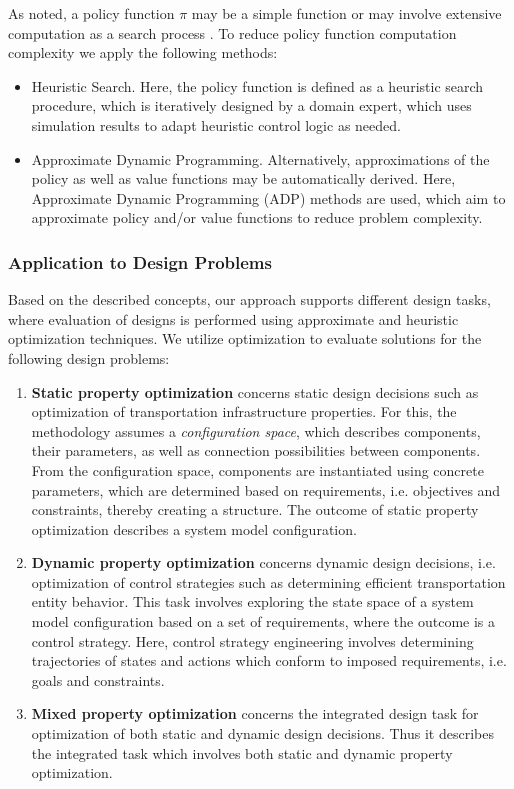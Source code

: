 \documentclass[a4paper,twoside]{article}
\begin{document}
As noted, a policy function $\pi$ may be a simple function or may involve extensive computation as a search process \cite{mania2018simple}. To reduce policy function computation complexity we apply the following methods:
\begin{itemize}
	\item Heuristic Search. Here, the policy function is defined as a heuristic search procedure, which is iteratively designed by a domain expert, which uses simulation results to adapt heuristic control logic as needed. 
	\item Approximate Dynamic Programming. Alternatively, approximations of the policy as well as value functions may be automatically derived. Here, Approximate Dynamic Programming (ADP) methods \cite{powell_approximate_2007} are used, which aim to approximate policy and/or value functions to reduce problem complexity. 
\end{itemize}

	\subsubsection{Application to Design Problems}
	Based on the described concepts, our approach supports different design tasks, where evaluation of designs is performed using approximate and heuristic optimization techniques. We utilize optimization to evaluate solutions for the following design problems:

	\begin{enumerate}
		\item \textbf{Static property optimization} concerns static design decisions such as optimization of transportation infrastructure properties. For this, the methodology assumes a \textit{configuration space}, which describes components, their parameters, as well as connection possibilities between components. From the configuration space, components are instantiated using concrete parameters, which are determined based on requirements, i.e. objectives and constraints, thereby creating a structure. The outcome of static property  optimization describes a system model configuration.
		\item \textbf{Dynamic property optimization} concerns dynamic design decisions, i.e. optimization of control strategies such as determining efficient transportation entity behavior. This task involves exploring the state space of a system model configuration based on a set of requirements, where the outcome is a control strategy. Here, control strategy engineering involves determining trajectories of states and actions which conform to imposed requirements, i.e. goals and constraints. 
		\item \textbf{Mixed property optimization} concerns the integrated design task for optimization of both static and dynamic design decisions. Thus it describes the integrated task which involves both static and dynamic property optimization.
	\end{enumerate}
	
\end{document}

